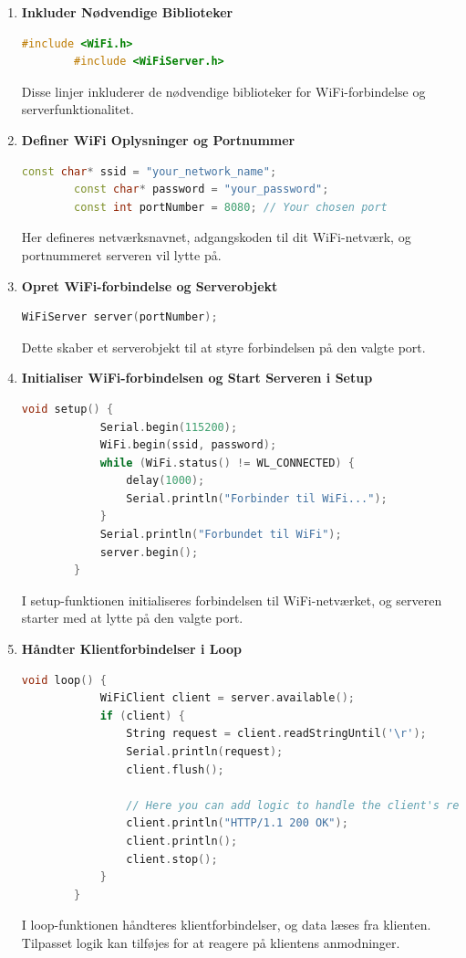 \begin{enumerate}
	\item \textbf{Inkluder Nødvendige Biblioteker}
	\begin{lstlisting}[language=C++, caption=Syntaks]
		#include <WiFi.h>
		#include <WiFiServer.h>
	\end{lstlisting}
	Disse linjer inkluderer de nødvendige biblioteker for WiFi-forbindelse og serverfunktionalitet.
	
	\item \textbf{Definer WiFi Oplysninger og Portnummer}
	\begin{lstlisting}[language=C++, caption=Syntaks]
		const char* ssid = "your_network_name";
		const char* password = "your_password";
		const int portNumber = 8080; // Your chosen port
	\end{lstlisting}
	Her defineres netværksnavnet, adgangskoden til dit WiFi-netværk, og portnummeret serveren vil lytte på.
	
	\item \textbf{Opret WiFi-forbindelse og Serverobjekt}
	\begin{lstlisting}[language=C++, caption=Syntaks]
		WiFiServer server(portNumber);
	\end{lstlisting}
	Dette skaber et serverobjekt til at styre forbindelsen på den valgte port.
	
	\item \textbf{Initialiser WiFi-forbindelsen og Start Serveren i Setup}
	\begin{lstlisting}[language=C++, caption=Syntaks]
		void setup() {
			Serial.begin(115200);
			WiFi.begin(ssid, password);
			while (WiFi.status() != WL_CONNECTED) {
				delay(1000);
				Serial.println("Forbinder til WiFi...");
			}
			Serial.println("Forbundet til WiFi");
			server.begin();
		}
	\end{lstlisting}
	I setup-funktionen initialiseres forbindelsen til WiFi-netværket, og serveren starter med at lytte på den valgte port.
	
	\item \textbf{Håndter Klientforbindelser i Loop}
	\begin{lstlisting}[language=C++, caption=Syntaks]
		void loop() {
			WiFiClient client = server.available();
			if (client) {
				String request = client.readStringUntil('\r');
				Serial.println(request);
				client.flush();
				
				// Here you can add logic to handle the client's request
				client.println("HTTP/1.1 200 OK");
				client.println();
				client.stop();
			}
		}
	\end{lstlisting}
	I loop-funktionen håndteres klientforbindelser, og data læses fra klienten. Tilpasset logik kan tilføjes for at reagere på klientens anmodninger.
\end{enumerate}

